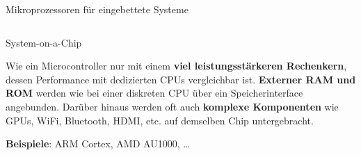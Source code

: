 {\begin{frame}{Mikroprozessoren für eingebettete Systeme}
\begin{columns}
        \begin{block}{System-on-a-Chip}
            \parbox{\linewidth}{
                \smallskip

                Wie ein Microcontroller nur mit einem \textbf{viel leistungsstärkeren
                Rechenkern}, dessen Performance mit dedizierten CPUs vergleichbar ist.
                \textbf{Externer RAM und ROM} werden wie bei einer diskreten CPU über
                ein Speicherinterface angebunden. Darüber hinaus werden oft auch
                \textbf{komplexe Komponenten} wie GPUs, WiFi, Bluetooth, HDMI, etc.
                auf demselben Chip untergebracht.
            }

            \smallskip

            \textbf{Beispiele}: ARM Cortex, AMD AU1000, …
        \end{block}
    \end{columns}
\end{frame}

}

